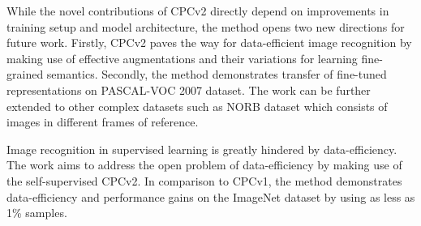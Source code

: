 \documentclass[11pt,letterpaper]{article}
\begin{document}
While the novel contributions of CPCv2 directly depend on improvements in training setup and model architecture, the method opens two new directions for future work. Firstly, CPCv2 paves the way for data-efficient image recognition by making use of effective augmentations and their variations for learning fine-grained semantics. Secondly, the method demonstrates transfer of fine-tuned representations on PASCAL-VOC 2007 dataset. The work can be further extended to other complex datasets such as NORB dataset which consists of images in different frames of reference. 

Image recognition in supervised learning is greatly hindered by data-efficiency. The work aims to address the open problem of data-efficiency by making use of the self-supervised CPCv2. In comparison to CPCv1, the method demonstrates data-efficiency and performance gains on the ImageNet dataset by using as less as 1\% samples.  
\end{document}
